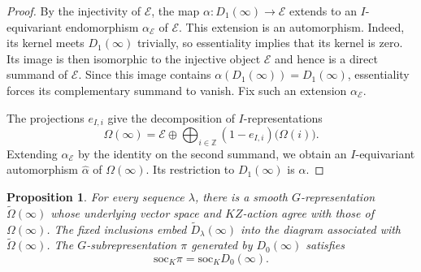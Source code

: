 \documentclass[10pt]{article}
\theoremstyle{plain}
\newtheorem{proposition}[theorem]{Proposition}
\theoremstyle{definition}
\theoremstyle{remark}
\newcommand{\soc}{\mathrm{soc}}
\begin{document}
\begin{proof}
By the injectivity of $\mathcal E$, the map $\alpha:D_1(\infty)\to\mathcal E$ extends to an $I$-equivariant endomorphism $\alpha_{\mathcal E}$ of $\mathcal E$. This extension is an automorphism. Indeed, its kernel meets $D_1(\infty)$ trivially, so essentiality implies that its kernel is zero. Its image is then isomorphic to the injective object $\mathcal E$ and hence is a direct summand of $\mathcal E$. Since this image contains $\alpha(D_1(\infty))=D_1(\infty)$, essentiality forces its complementary summand to vanish. Fix such an extension $\alpha_{\mathcal E}$.

The projections $e_{I,i}$ give the decomposition of $I$-representations
\[
\Omega(\infty)=\mathcal E\oplus
\bigoplus_{i\in\mathbb{Z}}(1-e_{I,i})\bigl(\Omega(i)\bigr).
\]
Extending $\alpha_{\mathcal E}$ by the identity on the second summand, we obtain an $I$-equivariant automorphism $\widehat\alpha$ of $\Omega(\infty)$. Its restriction to $D_1(\infty)$ is $\alpha$.
\end{proof}

\begin{proposition}\label{prop:modified-diagram-realization}
For every sequence $\lambda$, there is a smooth $G$-representation $\widetilde\Omega(\infty)$ whose underlying vector space and $KZ$-action agree with those of $\Omega(\infty)$. The fixed inclusions embed $\widetilde D_\lambda(\infty)$ into the diagram associated with $\widetilde\Omega(\infty)$. The $G$-subrepresentation $\pi$ generated by $D_0(\infty)$ satisfies
\[
\soc_K\pi=\soc_K D_0(\infty).
\]
\end{proposition}
\end{document}
